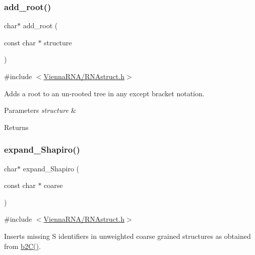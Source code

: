\subsubsection{\texorpdfstring{add\+\_\+root()}{add\_root()}}
{\footnotesize\ttfamily char$\ast$ add\+\_\+root (\begin{DoxyParamCaption}\item[{const char $\ast$}]{structure }\end{DoxyParamCaption})}



{\ttfamily \#include $<$\hyperlink{RNAstruct_8h}{Vienna\+R\+N\+A/\+R\+N\+Astruct.\+h}$>$}



Adds a root to an un-\/rooted tree in any except bracket notation. 


\begin{DoxyParams}{Parameters}
{\em structure} & \\
\hline
\end{DoxyParams}
\begin{DoxyReturn}{Returns}

\end{DoxyReturn}
\mbox{\label{group__struct__utils__deprecated_gabe3d815b420dc4553bfb23511198b4c6}} 
\subsubsection{\texorpdfstring{expand\+\_\+\+Shapiro()}{expand\_Shapiro()}}
{\footnotesize\ttfamily char$\ast$ expand\+\_\+\+Shapiro (\begin{DoxyParamCaption}\item[{const char $\ast$}]{coarse }\end{DoxyParamCaption})}



{\ttfamily \#include $<$\hyperlink{RNAstruct_8h}{Vienna\+R\+N\+A/\+R\+N\+Astruct.\+h}$>$}



Inserts missing \textquotesingle{}S\textquotesingle{} identifiers in unweighted coarse grained structures as obtained from \hyperlink{group__struct__utils__deprecated_ga9c80d92391f2833549a8b6dac92233f0}{b2\+C()}. 


